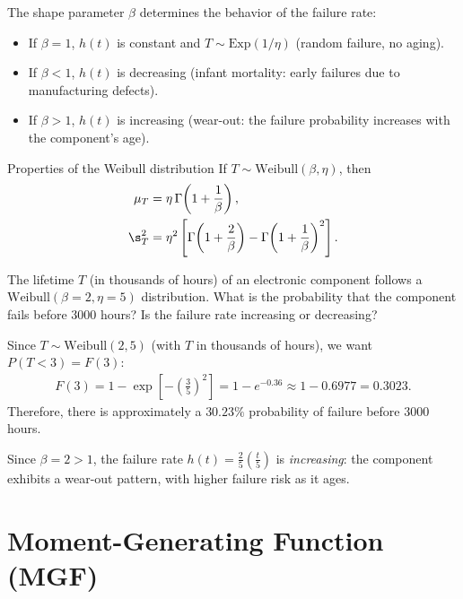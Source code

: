 \begin{observacion}
The shape parameter $\beta$ determines the behavior of the failure rate:
\begin{itemize}
 \item If $\beta = 1$, $h(t)$ is constant and $T \sim \text{Exp}(1/\eta)$ (random
 failure, no aging).
 \item If $\beta < 1$, $h(t)$ is decreasing (infant mortality: early failures due to
 manufacturing defects).
 \item If $\beta > 1$, $h(t)$ is increasing (wear-out: the failure probability
 increases with the component's age).
\end{itemize}
\end{observacion}

{Properties of the Weibull distribution} If $T \sim \text{Weibull}(\beta,\eta)$, then
\begin{align}
 \mu_T &= \eta\,\Gamma\!\left(1 + \frac{1}{\beta}\right), \\
 \s_T^2 &= \eta^2\left[\Gamma\!\left(1 + \frac{2}{\beta}\right)
 - \Gamma\!\left(1 + \frac{1}{\beta}\right)^2\right].
\end{align}

\begin{ejemplo}
 \label{exmp:2.8.8}
The lifetime $T$ (in thousands of hours) of an electronic component follows a
$\text{Weibull}(\beta=2, \eta=5)$ distribution. What is the probability that the
component fails before $3000$ hours? Is the failure rate increasing or decreasing?
\end{ejemplo}

\begin{solucion}
Since $T \sim \text{Weibull}(2,5)$ (with $T$ in thousands of hours), we want $P(T < 3) =
F(3)$:
\begin{align}
 F(3) = 1 - \exp\!\left[-\left(\frac{3}{5}\right)^2\right]
 = 1 - e^{-0.36} \approx 1 - 0.6977 = 0.3023.
\end{align}
Therefore, there is approximately a $30.23\%$ probability of failure before $3000$
hours.

Since $\beta = 2 > 1$, the failure rate $h(t) = \frac{2}{5}\left(\frac{t}{5}\right)$ is
\emph{increasing}: the component exhibits a wear-out pattern, with higher failure risk
as it ages.
\end{solucion}

\section{Moment-Generating Function (MGF)}
\label{sec:mgf}\label{sec:3.4}

